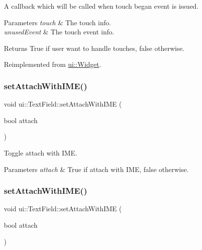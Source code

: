 A callback which will be called when touch began event is issued. 
\begin{DoxyParams}{Parameters}
{\em touch} & The touch info. \\
\hline
{\em unused\+Event} & The touch event info. \\
\hline
\end{DoxyParams}
\begin{DoxyReturn}{Returns}
True if user want to handle touches, false otherwise. 
\end{DoxyReturn}


Reimplemented from \hyperlink{classui_1_1Widget_a7885c770dde6daef771515c9857674a8}{ui\+::\+Widget}.

\mbox{\label{classui_1_1TextField_a987520fa2d96e9326a628bc1f9521605}} 
\subsubsection{\texorpdfstring{set\+Attach\+With\+I\+M\+E()}{setAttachWithIME()}\hspace{0.1cm}{\footnotesize\ttfamily [1/2]}}
{\footnotesize\ttfamily void ui\+::\+Text\+Field\+::set\+Attach\+With\+I\+ME (\begin{DoxyParamCaption}\item[{bool}]{attach }\end{DoxyParamCaption})}



Toggle attach with I\+ME. 


\begin{DoxyParams}{Parameters}
{\em attach} & True if attach with I\+ME, false otherwise. \\
\hline
\end{DoxyParams}
\mbox{\label{classui_1_1TextField_a987520fa2d96e9326a628bc1f9521605}} 
\subsubsection{\texorpdfstring{set\+Attach\+With\+I\+M\+E()}{setAttachWithIME()}\hspace{0.1cm}{\footnotesize\ttfamily [2/2]}}
{\footnotesize\ttfamily void ui\+::\+Text\+Field\+::set\+Attach\+With\+I\+ME (\begin{DoxyParamCaption}\item[{bool}]{attach }\end{DoxyParamCaption})}



